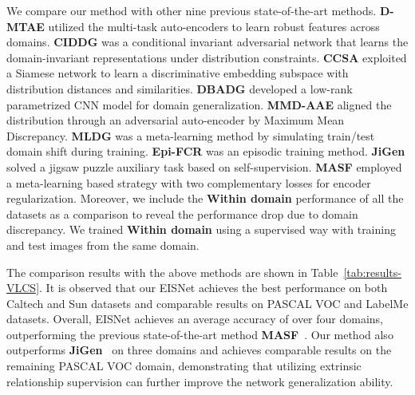 We compare our method with other nine previous state-of-the-art methods.
\textbf{D-MTAE} \cite{ghifary2015domain} utilized the multi-task auto-encoders to learn robust features across domains.
\textbf{CIDDG} \cite{li2018deep} was a conditional invariant adversarial network that learns the domain-invariant representations under distribution constraints.
\textbf{CCSA} \cite{motiian2017unified} exploited a Siamese network to learn a discriminative embedding subspace with distribution distances and similarities.
\textbf{DBADG} \cite{li2017deeper} developed a low-rank parametrized CNN model for domain generalization.
\textbf{MMD-AAE} \cite{li2018domain} aligned the distribution through an adversarial auto-encoder by Maximum Mean Discrepancy.
\textbf{MLDG} \cite{li2018learning} was a meta-learning method by simulating train/test domain shift during training.
\textbf{Epi-FCR} \cite{li2019episodic} was an episodic training method.
\textbf{JiGen} \cite{carlucci2019domain} solved a jigsaw puzzle auxiliary task based on self-supervision. 
\textbf{MASF} \cite{dou2019domain} employed a meta-learning based strategy with two complementary losses for encoder regularization.
Moreover, we include the \textbf{Within domain} performance of all the datasets as a comparison to reveal the performance drop due to domain discrepancy.
We trained \textbf{Within domain} using a supervised way with training and test images from the same domain.


The comparison results with the above methods are shown in Table~\ref{tab:results-VLCS}. 
It is observed that our EISNet achieves the best performance on both Caltech and Sun datasets and comparable results on PASCAL VOC and LabelMe datasets.
Overall, EISNet achieves an average accuracy of  over four domains, outperforming the previous state-of-the-art method \textbf{MASF}~\cite{dou2019domain}.
Our method also outperforms \textbf{JiGen}~\cite{carlucci2019domain} on three domains and achieves comparable results on the remaining PASCAL VOC domain, demonstrating that utilizing extrinsic relationship supervision can further improve the network generalization ability. 




